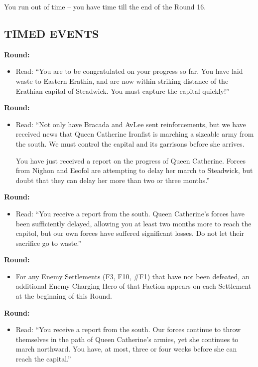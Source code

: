 \begin{multicols*}{2}
You run out of time -- you have time till the end of the Round 16.

\subsection*{\MakeUppercase{Timed Events}}

\textbf{ Round:}
\begin{itemize}
  \item Read: ``You are to be congratulated on your progress so far.
    You have laid waste to Eastern Erathia, and are now within striking distance of the Erathian
    capital of Steadwick. You must capture the capital quickly!''
\end{itemize}

\textbf{ Round:}
\begin{itemize}
  \item Read: ``Not only have Bracada and AvLee sent reinforcements, but we have received news that
    Queen Catherine Ironfist is marching a sizeable army from the south. We must control the capital and its
    garrisons before she arrives.

    You have just received a report on the progress of Queen Catherine.
    Forces from Nighon and Eeofol are attempting to delay her march to Steadwick,
    but doubt that they can delay her more than two or three months.''
\end{itemize}

\textbf{ Round:}
\begin{itemize}
  \item Read: ``You receive a report from the south. Queen Catherine's forces have been sufficiently delayed,
    allowing you at least two months more to reach the capitol, but our own forces have suffered significant
    losses. Do not let their sacrifice go to waste.''
\end{itemize}

\textbf{ Round:}
\begin{itemize}
  \item For any Enemy Settlements (F3, F10, \#F1) that have not been defeated, an additional Enemy
    Charging Hero of that Faction appears on each Settlement at the beginning of this Round.
\end{itemize}

\textbf{ Round:}
\begin{itemize}
  \item Read: ``You receive a report from the south. Our forces continue to throw themselves in the path of
    Queen Catherine's armies, yet she continues to march northward. You have, at most, three or four weeks
    before she can reach the capital.''
\end{itemize}


\end{multicols*}
